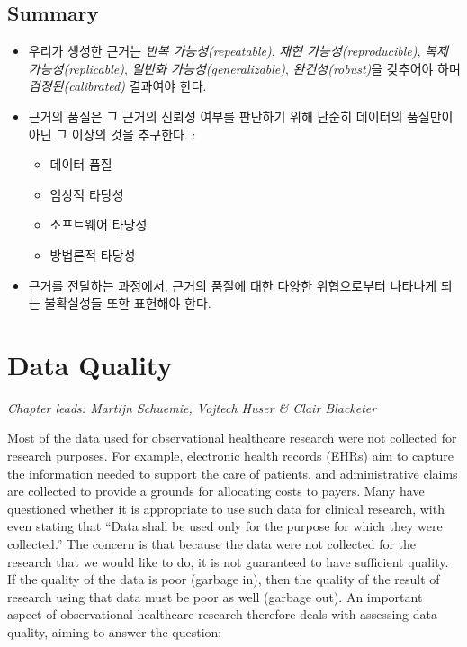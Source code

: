\documentclass[11pt]{book}
\providecommand{\tightlist}{%
  \setlength{\itemsep}{0pt}\setlength{\parskip}{0pt}}
\theoremstyle{definition}
\theoremstyle{definition}
\theoremstyle{definition}
\theoremstyle{remark}
\let\BeginKnitrBlock\begin \let\EndKnitrBlock\end
\begin{document}
\section{Summary}\label{summary-9}

\BeginKnitrBlock{rmdsummary}
\begin{itemize}
\item
  우리가 생성한 근거는 \emph{반복 가능성(repeatable)}, \emph{재현
  가능성(reproducible)}, \emph{복제 가능성(replicable)}, \emph{일반화
  가능성(generalizable)}, \emph{완건성(robust)}을 갖추어야 하며
  \emph{검정된(calibrated)} 결과여야 한다.
\item
  근거의 품질은 그 근거의 신뢰성 여부를 판단하기 위해 단순히 데이터의
  품질만이 아닌 그 이상의 것을 추구한다. :

  \begin{itemize}
  \tightlist
  \item
    데이터 품질
  \item
    임상적 타당성
  \item
    소프트웨어 타당성
  \item
    방법론적 타당성
  \end{itemize}
\item
  근거를 전달하는 과정에서, 근거의 품질에 대한 다양한 위협으로부터
  나타나게 되는 불확실성들 또한 표현해야 한다.
\end{itemize}
\EndKnitrBlock{rmdsummary}

\chapter{Data Quality}\label{DataQuality}

\emph{Chapter leads: Martijn Schuemie, Vojtech Huser \& Clair Blacketer}

Most of the data used for observational healthcare research were not
collected for research purposes. For example, electronic health records
(EHRs) aim to capture the information needed to support the care of
patients, and administrative claims are collected to provide a grounds
for allocating costs to payers. Many have questioned whether it is
appropriate to use such data for clinical research, with
\citet{vanDerLei_1991} even stating that ``Data shall be used only for
the purpose for which they were collected.'' The concern is that because
the data were not collected for the research that we would like to do,
it is not guaranteed to have sufficient quality. If the quality of the
data is poor (garbage in), then the quality of the result of research
using that data must be poor as well (garbage out). An important aspect
of observational healthcare research therefore deals with assessing data
quality, aiming to answer the question:
\end{document}
